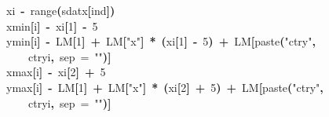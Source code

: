 \documentclass[a4paper]{article}
\newcommand{\hlnumber}[1]{\textcolor[rgb]{0.0823529411764706,0.0784313725490196,0.709803921568627}{#1}}%
\newcommand{\hlfunctioncall}[1]{\textcolor[rgb]{1,0,0}{#1}}%
\newcommand{\hlstring}[1]{\textcolor[rgb]{0.6,0.6,1}{#1}}%
\newcommand{\hlkeyword}[1]{\textcolor[rgb]{0,0,0}{\textbf{#1}}}%
\newcommand{\hlargument}[1]{\textcolor[rgb]{0.694117647058824,0.247058823529412,0.0196078431372549}{#1}}%
\newcommand{\hlassignement}[1]{\textcolor[rgb]{0.215686274509804,0.215686274509804,0.384313725490196}{\textbf{#1}}}%
\newcommand{\hlsymbol}[1]{\textcolor[rgb]{0,0,0}{#1}}%
\newcommand{\hlprompt}[1]{\textcolor[rgb]{0,0,0}{#1}}%
\newcommand{\hlstd}[1]{\textcolor[rgb]{0,0,0}{#1}}%
\newenvironment{Houtput}{\raggedright}{%
%
}
\begin{document}
\begin{Houtput}
\hlstd{}\hlprompt{{\ }}{\ }{\ }{\ }{\ }\hlsymbol{xi}{\ }\hlassignement{\usebox{\hlnormalsizeboxlessthan}-}{\ }\hlfunctioncall{range}\hlkeyword{(}\hlsymbol{sdat}\hlkeyword{\usebox{\hlnormalsizeboxdollar}}\hlsymbol{x}\hlkeyword{[}\hlsymbol{ind}\hlkeyword{]}\hlkeyword{)}\hspace*{\fill}\\
\hlstd{}\hlprompt{{\ }}{\ }{\ }{\ }{\ }\hlsymbol{xmin}\hlkeyword{[}\hlsymbol{i}\hlkeyword{]}{\ }\hlassignement{\usebox{\hlnormalsizeboxlessthan}-}{\ }\hlsymbol{xi}\hlkeyword{[}\hlnumber{1}\hlkeyword{]}{\ }\hlkeyword{-}{\ }\hlnumber{5}\hspace*{\fill}\\
\hlstd{}\hlprompt{{\ }}{\ }{\ }{\ }{\ }\hlsymbol{ymin}\hlkeyword{[}\hlsymbol{i}\hlkeyword{]}{\ }\hlassignement{\usebox{\hlnormalsizeboxlessthan}-}{\ }\hlsymbol{LM}\hlkeyword{[}\hlnumber{1}\hlkeyword{]}{\ }\hlkeyword{+}{\ }\hlsymbol{LM}\hlkeyword{[}\hlstring{"x"}\hlkeyword{]}{\ }\hlkeyword{*}{\ }\hlkeyword{(}\hlsymbol{xi}\hlkeyword{[}\hlnumber{1}\hlkeyword{]}{\ }\hlkeyword{-}{\ }\hlnumber{5}\hlkeyword{)}{\ }\hlkeyword{+}{\ }\hlsymbol{LM}\hlkeyword{[}\hlfunctioncall{paste}\hlkeyword{(}\hlstring{"ctry"}\hlkeyword{,}\hspace*{\fill}\\
\hlstd{}\hlprompt{{\ }}{\ }{\ }{\ }{\ }{\ }{\ }{\ }{\ }\hlsymbol{ctryi}\hlkeyword{,}{\ }\hlargument{sep}{\ }\hlargument{=}{\ }\hlstring{""}\hlkeyword{)}\hlkeyword{]}\hspace*{\fill}\\
\hlstd{}\hlprompt{{\ }}{\ }{\ }{\ }{\ }\hlsymbol{xmax}\hlkeyword{[}\hlsymbol{i}\hlkeyword{]}{\ }\hlassignement{\usebox{\hlnormalsizeboxlessthan}-}{\ }\hlsymbol{xi}\hlkeyword{[}\hlnumber{2}\hlkeyword{]}{\ }\hlkeyword{+}{\ }\hlnumber{5}\hspace*{\fill}\\
\hlstd{}\hlprompt{{\ }}{\ }{\ }{\ }{\ }\hlsymbol{ymax}\hlkeyword{[}\hlsymbol{i}\hlkeyword{]}{\ }\hlassignement{\usebox{\hlnormalsizeboxlessthan}-}{\ }\hlsymbol{LM}\hlkeyword{[}\hlnumber{1}\hlkeyword{]}{\ }\hlkeyword{+}{\ }\hlsymbol{LM}\hlkeyword{[}\hlstring{"x"}\hlkeyword{]}{\ }\hlkeyword{*}{\ }\hlkeyword{(}\hlsymbol{xi}\hlkeyword{[}\hlnumber{2}\hlkeyword{]}{\ }\hlkeyword{+}{\ }\hlnumber{5}\hlkeyword{)}{\ }\hlkeyword{+}{\ }\hlsymbol{LM}\hlkeyword{[}\hlfunctioncall{paste}\hlkeyword{(}\hlstring{"ctry"}\hlkeyword{,}\hspace*{\fill}\\
\hlstd{}\hlprompt{{\ }}{\ }{\ }{\ }{\ }{\ }{\ }{\ }{\ }\hlsymbol{ctryi}\hlkeyword{,}{\ }\hlargument{sep}{\ }\hlargument{=}{\ }\hlstring{""}\hlkeyword{)}\hlkeyword{]}\hspace*{\fill}\\
\hlstd{}\hlprompt{{\ }}\hlkeyword{\usebox{\hlnormalsizeboxclosebrace}}\mbox{}
\normalfont
\hspace*{\fill}\\
\hlstd{}
\end{Houtput}
\end{document}
